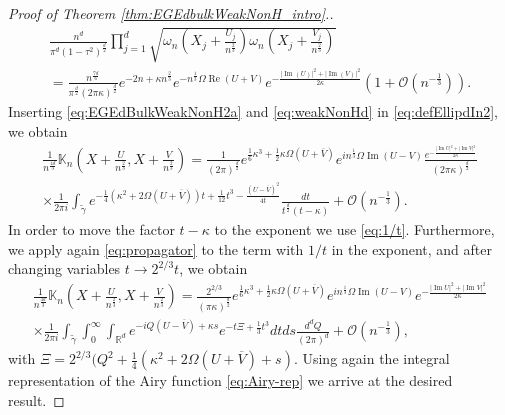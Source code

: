 \documentclass[%
 jmp,
cp,  %
 amsmath,amsthm,amssymb,%
 reprint,%
onecolumn]{revtex4-2}
\begin{document}
\begin{proof}[Proof of Theorem \ref{thm:EGEdbulkWeakNonH_intro}.]
\begin{multline}
\frac{n^d}{\pi^d (1-\tau^2)^\frac{d}{2}}\prod_{j=1}^d \sqrt{\omega_n\left(X_j+\frac{U_j}{n^\frac{2}{3}}\right)\omega_n\left(X_j+\frac{V_j}{n^\frac{2}{3}}\right)}\\
= \frac{n^\frac{7 d}{6}}{\pi^\frac{d}{2} (2\pi \kappa)^\frac{d}{2}} e^{-2n + \kappa n^\frac{2}{3}} 
e^{- n^\frac{1}{3} \Omega \operatorname{Re}(U+V)}
e^{- \frac{\lvert \operatorname{Im}(U)\rvert^2+\lvert \operatorname{Im}(V)\rvert^2}{2 \kappa }}
\left(1 + \mathcal O\left(n^{-\frac{1}{3}}\right)\right).
\end{multline}
Inserting \eqref{eq:EGEdBulkWeakNonH2a} and \eqref{eq:weakNonHd} in \eqref{eq:defEllipdIn2}, we obtain
\begin{multline*}
\frac{1}{n^\frac{4 d}{3}} \mathbb K_n\left(X+\frac{U}{n^\frac{2}{3}}, X+\frac{V}{n^\frac{2}{3}}\right)
= 
\frac{1}{(2\pi)^\frac{d}{2}}e^{\frac{1}{6}\kappa^3+\frac{1}{2}\kappa \Omega (U+\overline V)}
e^{i n^\frac{1}{3} \Omega \operatorname{Im}(U-V)}
\frac{e^{-\frac{\lvert \operatorname{Im} U\rvert^2+\lvert \operatorname{Im} V\rvert^2}{2\kappa}}}{(2\pi \kappa)^\frac{d}{2}}\\
\times \frac{1}{2\pi i} \int_{\tilde\gamma} e^{- \frac{1}{4} (\kappa^2 + 2 \Omega (U+\overline V)) t + \frac{1}{12} t^3 -\frac{(U-\overline V)^2}{4 t}} \frac{dt}{t^\frac{d}{2} (t-\kappa)} +\mathcal O\left(n^{-\frac{1}{3}}\right).
\end{multline*}
In order to move the factor $t-\kappa$ to the exponent we use \eqref{eq:1/t}.
Furthermore, we apply again \eqref{eq:propagator} to the term with $1/t$ in the exponent, and after changing variables $t\to 2^{2/3}t$, we obtain
\begin{multline*}
\frac{1}{n^\frac{4 d}{3}} \mathbb K_n\left(X+\frac{U}{n^\frac{2}{3}}, X+\frac{V}{n^\frac{2}{3}}\right)
= 
\frac{2^{2/3}}{(\pi\kappa)^\frac{d}{2}}e^{\frac{1}{6}\kappa^3+\frac{1}{2}\kappa \Omega (U+\overline V)}
e^{i n^\frac{1}{3} \Omega \operatorname{Im}(U-V)}
e^{-\frac{\lvert \operatorname{Im} U\rvert^2+\lvert \operatorname{Im} V\rvert^2}{2\kappa}}\\
\times \frac{1}{2\pi i} \int_{\tilde\gamma} 
\int_0^\infty\int_{\mathbb{R}^d}
e^{-iQ(U-\overline{V})+ \kappa s} e^{-t\Xi+\frac13 t^3}dtds \frac{d^dQ}{(2\pi)^d}+\mathcal O\left(n^{-\frac{1}{3}}\right),
\end{multline*}
with $\Xi=2^{2/3}(Q^2+\frac14(\kappa^2+2\Omega(U+\overline{V})+s)$. Using again the integral representation of the Airy function \eqref{eq:Airy-rep} we arrive at the desired result. 
\end{proof}
\end{document}

